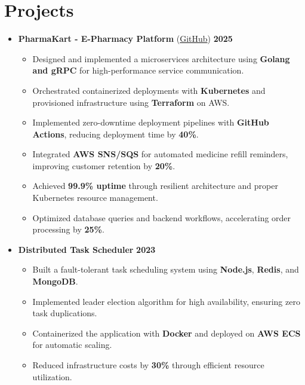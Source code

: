 \documentclass[11pt,a4paper,sans]{moderncv}
\newcommand{\sectionseparator}{\vspace{5pt}\par\noindent\makebox[\linewidth]{\rule{\textwidth}{0.4pt}}\vspace{0pt}}
\begin{document}
\sectionseparator

\section{Projects}
\begin{itemize}[leftmargin=*]
    \item \textbf{PharmaKart - E-Pharmacy Platform} (\href{https://github.com/PharmaKart/pharmakart-web}{GitHub}) \hfill \textbf{2025}
    \begin{itemize}
        \item Designed and implemented a microservices architecture using \textbf{Golang and gRPC} for high-performance service communication.
        \item Orchestrated containerized deployments with \textbf{Kubernetes} and provisioned infrastructure using \textbf{Terraform} on AWS.
        \item Implemented zero-downtime deployment pipelines with \textbf{GitHub Actions}, reducing deployment time by \textbf{40\%}.
        \item Integrated \textbf{AWS SNS/SQS} for automated medicine refill reminders, improving customer retention by \textbf{20\%}.
        \item Achieved \textbf{99.9\% uptime} through resilient architecture and proper Kubernetes resource management.
        \item Optimized database queries and backend workflows, accelerating order processing by \textbf{25\%}.
    \end{itemize}
    
    \item \textbf{Distributed Task Scheduler} \hfill \textbf{2023}
    \begin{itemize}
        \item Built a fault-tolerant task scheduling system using \textbf{Node.js}, \textbf{Redis}, and \textbf{MongoDB}.
        \item Implemented leader election algorithm for high availability, ensuring zero task duplications.
        \item Containerized the application with \textbf{Docker} and deployed on \textbf{AWS ECS} for automatic scaling.
        \item Reduced infrastructure costs by \textbf{30\%} through efficient resource utilization.
    \end{itemize}
\end{itemize}
\end{document}
